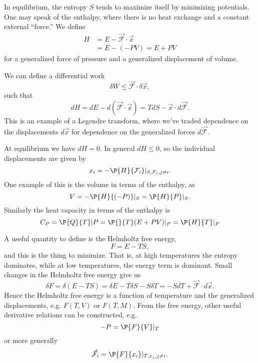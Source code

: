 In equilibrium, the entropy $S$ tends to maximize itself by minimizing potentials. One may speak of the enthalpy, where there is no heat exchange and a constant external ``force.'' We define
\begin{align}
    H &= E - \vec{\mathcal{F}}\cdot \vec x\\
    &= E-(-PV) = E+PV
\end{align}
for a generalized force of pressure and a generalized displacement of volume.

We can define a differential work
\begin{equation}
    \delta W \leq \vec{\mathcal{F}} \cdot \delta \vec x,
\end{equation}
such that
\begin{equation}
    dH = dE  -d(\vec{\mathcal F} \cdot \vec x) = TdS - \vec x \cdot d \vec{\mathcal F}.
\end{equation}
This is an example of a Legendre transform, where we've traded dependence on the displacements $d\vec x$ for dependence on the generalized forces $d\vec{\mathcal F}$.

At equilibrium we have $dH=0$. In general $dH \leq 0$, so the individual displacements are given by
\begin{equation}
    x_i = -\P{H}{\mathcal{F}_i}|_{S,\mathcal F_j, j\neq i}.
\end{equation}
One example of this is the volume in terms of the enthalpy, as
\begin{equation}
    V=-\P{H}{(-P)}|_S = \P{H}{P}|_S.
\end{equation}
Similarly the heat capacity in terms of the enthalpy is
\begin{equation}
    C_P= \P{Q}{T}|P =\P{}{T} (E+PV)|_P = \P{H}{T}|_P
\end{equation}

A useful quantity to define is the Helmholtz free energy,
\begin{equation}
    F= E-TS,
\end{equation}
and this is the thing to minimize. That is, at high temperatures the entropy dominates, while at low temperatures, the energy term is dominant. Small changes in the Helmholtz free energy give us
\begin{equation}
    \delta F = \delta (E-TS) = \delta E - T\delta S - S \delta T = -S dT + \vec{\mathcal{F}}\cdot d\vec x.
\end{equation}
Hence the Helmholtz free energy is a function of temperature and the generalized displacements, e.g. $F(T,V)$ or $F(T,M)$. From the free energy, other useful derivative relations can be constructed, e.g.
\begin{equation}
    -P = \P{F}{V}|_T
\end{equation}
or more generally
\begin{equation}
    \vec{\mathcal{F}}_i = \P{F}{x_i}|_{T,x_j, j\neq i}.
\end{equation}

